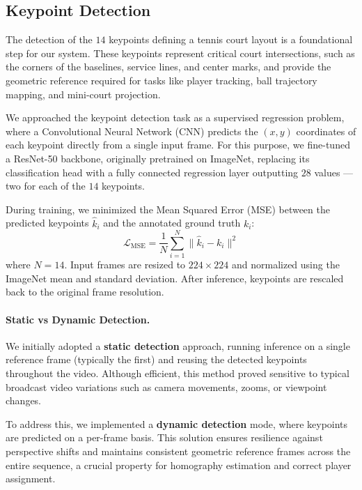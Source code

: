 
\subsection{Keypoint Detection}

The detection of the $14$ keypoints defining a tennis court layout is a foundational step for our system. 
These keypoints represent critical court intersections, such as the corners of the baselines, service lines, and center marks, and provide the geometric reference required for tasks like player tracking, ball trajectory mapping, and mini-court projection.

We approached the keypoint detection task as a supervised regression problem, where a Convolutional Neural Network (CNN) predicts the $(x, y)$ coordinates of each keypoint directly from a single input frame.  
For this purpose, we fine-tuned a ResNet-50 backbone, originally pretrained on ImageNet, replacing its classification head with a fully connected regression layer outputting $28$ values — two for each of the $14$ keypoints.  

During training, we minimized the Mean Squared Error (MSE) between the predicted keypoints $\hat{k}_i$ and the annotated ground truth $k_i$:
\[
\mathcal{L}_{\text{MSE}} = \frac{1}{N} \sum_{i=1}^{N} \| \hat{k}_i - k_i \|^2
\]
where $N = 14$.  
Input frames are resized to $224 \times 224$ and normalized using the ImageNet mean and standard deviation. 
After inference, keypoints are rescaled back to the original frame resolution.

\paragraph{Static vs Dynamic Detection.}  
We initially adopted a \textbf{static detection} approach, running inference on a single reference frame (typically the first) and reusing the detected keypoints throughout the video.  
Although efficient, this method proved sensitive to typical broadcast video variations such as camera movements, zooms, or viewpoint changes.

To address this, we implemented a \textbf{dynamic detection} mode, where keypoints are predicted on a per-frame basis.  
This solution ensures resilience against perspective shifts and maintains consistent geometric reference frames across the entire sequence, a crucial property for homography estimation and correct player assignment.

